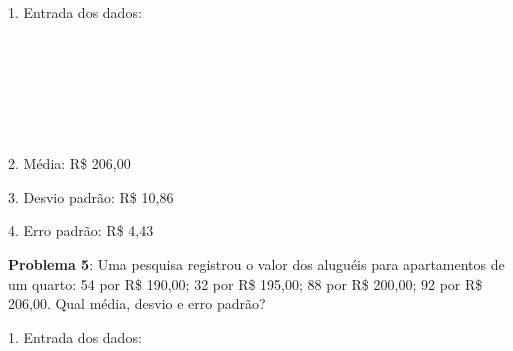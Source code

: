 1. Entrada dos dados: \\
  \\
   \keystroke{$\sum+$} \\ 
   \keystroke{$\sum+$} \\ 
   \keystroke{$\sum+$} \\ 
   \keystroke{$\sum+$} \\ 
   \keystroke{$\sum+$} \\ 
   \keystroke{$\sum+$}

2. Média: R\$ 206,00 \\
 

3. Desvio padrão: R\$ 10,86 \\
 

4. Erro padrão: R\$ 4,43 \\
     \keystroke{$\div$}

\textbf{Problema 5}: Uma pesquisa registrou o valor dos aluguéis para apartamentos de um quarto: 54 por R\$ 190,00; 32 por R\$ 195,00; 88 por R\$ 200,00; 92 por R\$ 206,00. Qual média, desvio e erro padrão?

1. Entrada dos dados: \\
  \\
    
   
\keystroke{$+$}  \keystroke{$\times$} \keystroke{$\sum+$} \\ 
    
   
\keystroke{$+$}  \keystroke{$\times$} \keystroke{$\sum+$} \\ 
    
   
\keystroke{$+$}  \keystroke{$\times$} \keystroke{$\sum+$} \\ 
    
   
\keystroke{$+$}  \keystroke{$\times$} \keystroke{$\sum+$} \\ 

